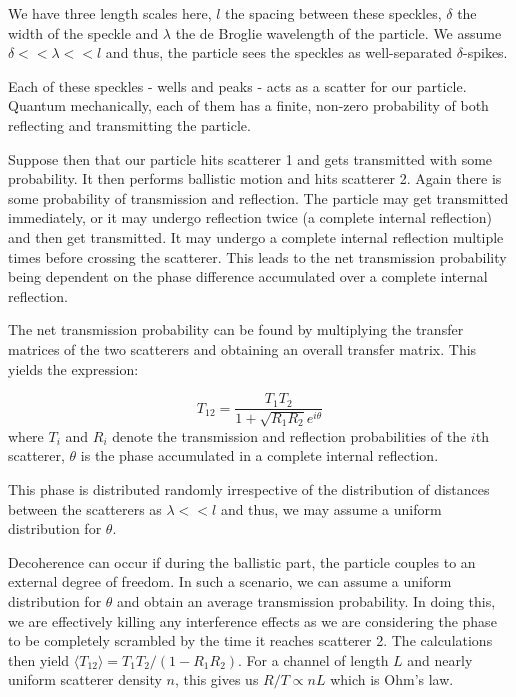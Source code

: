 \documentclass[twocolumn,nobalancelastpage]{report}
\begin{document}
We have three length scales here, $l$ the
spacing between these speckles, $\delta$ the width of the speckle and
$\lambda$ the de Broglie wavelength of the particle. We assume $\delta <<
\lambda << l$ and thus, the particle sees the speckles as well-separated
$\delta$-spikes.

Each of these speckles - wells and peaks - acts as a
scatter for our particle. Quantum mechanically, each of them has a
finite, non-zero probability of both reflecting and transmitting the
particle.

Suppose then that our particle hits scatterer 1 and gets
transmitted with some probability. It then performs ballistic motion and
hits scatterer 2. Again there is some probability of transmission and
reflection. The particle may get transmitted immediately, or it may
undergo reflection twice (a complete internal reflection) and then get
transmitted. It may undergo a complete internal reflection multiple times
before crossing the scatterer. This leads to the net transmission
probability being dependent on the phase difference accumulated over
a complete internal reflection.

The net transmission probability can
be found by multiplying the transfer matrices of the two scatterers and
obtaining an overall transfer matrix. This yields the expression:

\begin{equation}
    T_{12} = \frac{T_1 T_2}{1 + \sqrt{R_1 R_2} e^{i\theta}}
\end{equation}
where $T_i$ and $R_i$ denote the transmission and reflection
probabilities of the $i$th scatterer, $\theta$ is the phase accumulated
in a complete internal reflection.

This phase is distributed randomly irrespective of the distribution of
distances between the scatterers as $\lambda << l$ and thus, we may
assume a uniform distribution for $\theta$.

Decoherence can occur if during the ballistic part, the particle couples
to an external degree of freedom. In such a scenario, we can assume a
uniform distribution for $\theta$ and obtain an average transmission
probability. In doing this, we are effectively killing any interference
effects as we are considering the phase to be completely scrambled by the time
it reaches scatterer 2. The calculations then yield $\langle T_{12} \rangle
= T_1 T_2 / (1 - R_1 R_2)$. For a channel of length $L$ and nearly uniform
scatterer density $n$, this gives us $R/T \propto nL$ which is Ohm's law.
\end{document}
